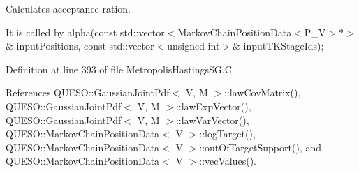 Calculates acceptance ration. 

It is called by alpha(const std\-::vector$<$Markov\-Chain\-Position\-Data$<$\-P\-\_\-\-V$>$$\ast$$>$\& input\-Positions, const std\-::vector$<$unsigned int$>$\& input\-T\-K\-Stage\-Ids); 

Definition at line 393 of file Metropolis\-Hastings\-S\-G.\-C.



References Q\-U\-E\-S\-O\-::\-Gaussian\-Joint\-Pdf$<$ V, M $>$\-::law\-Cov\-Matrix(), Q\-U\-E\-S\-O\-::\-Gaussian\-Joint\-Pdf$<$ V, M $>$\-::law\-Exp\-Vector(), Q\-U\-E\-S\-O\-::\-Gaussian\-Joint\-Pdf$<$ V, M $>$\-::law\-Var\-Vector(), Q\-U\-E\-S\-O\-::\-Markov\-Chain\-Position\-Data$<$ V $>$\-::log\-Target(), Q\-U\-E\-S\-O\-::\-Markov\-Chain\-Position\-Data$<$ V $>$\-::out\-Of\-Target\-Support(), and Q\-U\-E\-S\-O\-::\-Markov\-Chain\-Position\-Data$<$ V $>$\-::vec\-Values().


